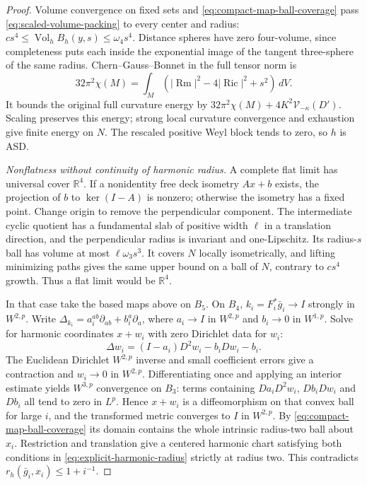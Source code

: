 \documentclass[11pt]{article}
\numberwithin{equation}{section}
\theoremstyle{definition}
\theoremstyle{remark}
\DeclareMathOperator{\Ric}{Ric}
\DeclareMathOperator{\Vol}{Vol}
\newcommand{\R}{\mathbb R}
\begin{document}
\begin{proof}
Volume convergence on fixed sets and
\eqref{eq:compact-map-ball-coverage} pass
\eqref{eq:scaled-volume-packing} to every center and radius:
\(cs^4\le\Vol_hB_h(y,s)\le\omega_4s^4\).
Distance spheres have zero four-volume, since completeness puts
each inside the exponential image of the tangent three-sphere
of the same radius. Chern--Gauss--Bonnet in the full tensor norm is
\[
 32\pi^2\chi(M)=\int_M
       (|\operatorname{Rm}|^2-4|\Ric|^2+s^2)\,dV.
\]
It bounds the original full curvature energy by
\(32\pi^2\chi(M)+4K^2\mathcal V_{-\kappa}(D')\).
Scaling preserves this energy; strong local curvature convergence
and exhaustion give finite energy on \(N\). The rescaled
positive Weyl block tends to zero, so \(h\) is ASD.

\emph{Nonflatness without continuity of harmonic radius.}
A complete flat limit has universal cover \(\R^4\). If a nonidentity
free deck isometry \(Ax+b\) exists, the projection of \(b\)
to \(\ker(I-A)\) is nonzero; otherwise the isometry has a fixed
point. Change origin to remove the perpendicular component.
The intermediate cyclic quotient has a fundamental slab of
positive width \(\ell\) in a translation direction, and the
perpendicular radius is invariant and one-Lipschitz. Its
radius-\(s\) ball has volume at most \(\ell\omega_3s^3\).
It covers \(N\) locally isometrically, and lifting minimizing
paths gives the same upper bound on a ball of \(N\), contrary
to \(cs^4\) growth. Thus a flat limit would be \(\R^4\).

In that case take the based maps above on \(B_5\).
On \(B_4\), \(k_i=F_i^*\bar g_i\to I\) strongly in
\(W^{2,p}\). Write
\(\Delta_{k_i}=a_i^{ab}\partial_{ab}+b_i^a\partial_a\),
where \(a_i\to I\) in \(W^{2,p}\) and \(b_i\to0\)
in \(W^{1,p}\). Solve for harmonic coordinates \(x+w_i\)
with zero Dirichlet data for \(w_i\):
\[
 \Delta w_i=(I-a_i)D^2w_i-b_iDw_i-b_i .
\]
The Euclidean Dirichlet \(W^{2,p}\) inverse and small coefficient
errors give a contraction and \(w_i\to0\) in \(W^{2,p}\).
Differentiating once and applying an interior estimate yields
\(W^{3,p}\) convergence on \(B_3\): terms containing
\(Da_iD^2w_i\), \(Db_iDw_i\) and \(Db_i\) all tend to
zero in \(L^p\). Hence \(x+w_i\) is a diffeomorphism on
that convex ball for large \(i\), and the transformed metric
converges to \(I\) in \(W^{2,p}\). By
\eqref{eq:compact-map-ball-coverage} its domain contains the
whole intrinsic radius-two ball about \(x_i\).
Restriction and translation give a centered harmonic chart
satisfying both conditions in \eqref{eq:explicit-harmonic-radius}
strictly at radius two. This contradicts
\(r_h(\bar g_i,x_i)\le1+i^{-1}\).


\end{proof}
\end{document}
